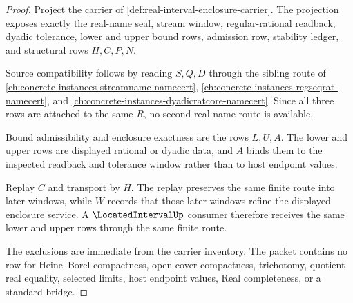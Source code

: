 \begin{proof}
Project the carrier of \autoref{def:real-interval-enclosure-carrier}. The projection exposes exactly the real-name seal, stream window, regular-rational readback, dyadic tolerance, lower and upper bound rows, admission row, stability ledger, and structural rows $H,C,P,N$.

Source compatibility follows by reading $S,Q,D$ through the sibling route of \autoref{ch:concrete-instances-streamname-namecert}, \autoref{ch:concrete-instances-regseqrat-namecert}, and \autoref{ch:concrete-instances-dyadicratcore-namecert}. Since all three rows are attached to the same $R$, no second real-name route is available.

Bound admissibility and enclosure exactness are the rows $L,U,A$. The lower and upper rows are displayed rational or dyadic data, and $A$ binds them to the inspected readback and tolerance window rather than to host endpoint values.

Replay $C$ and transport by $H$. The replay preserves the same finite route into later windows, while $W$ records that those later windows refine the displayed enclosure service. A $\LocatedIntervalUp$ consumer therefore receives the same lower and upper rows through the same finite route.

The exclusions are immediate from the carrier inventory. The packet contains no row for Heine--Borel compactness, open-cover compactness, trichotomy, quotient real equality, selected limits, host endpoint values, Real completeness, or a standard bridge.
\end{proof}

